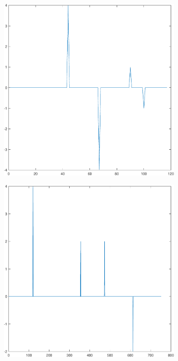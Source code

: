 \documentclass[sigconf]{acmart}
\begin{document}
	\begin{figure}[!htp]
		\centering
		\begin{subfigure}[t]{0.4\linewidth}
			\centering
			\includegraphics[width=0.95\linewidth, trim={100 100 0 0}, clip=true]{fig/route_change_8}
			\label{fig:3.2a}
		\end{subfigure}
		\begin{subfigure}[t]{0.4\linewidth}
			\centering
			\includegraphics[width=0.95\linewidth, trim={100 100 0 0}, clip]{fig/route_change_20}

\end{subfigure}
\end{figure}
\end{document}
